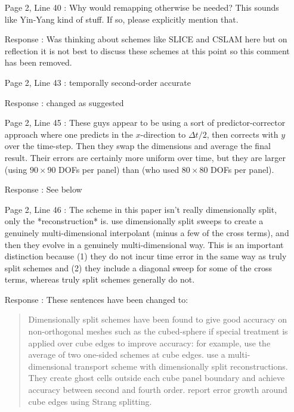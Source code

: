 \documentclass[12pt]{article}
\begin{document}
\begin{enumerate}
\item [Page 2, Line 40]: Why would remapping otherwise be needed? This sounds like Yin-Yang kind of stuff. If so, please explicitly mention that.

\item [Response]: Was thinking about schemes like SLICE and CSLAM here but on reflection it is not best to discuss these schemes at this point so this comment has been removed. 

\item [Page 2, Line 43]: temporally second-order accurate

\item [Response]: changed as suggested

\item [Page 2, Line 45]: These guys \cite[]{PL07} appear to be using a sort of predictor-corrector approach where one predicts in the $x$-direction to $\Delta t/2$, then corrects with $y$ over the time-step. Then they swap the dimensions and average the final result. Their errors are certainly more uniform over time, but they are larger (using $90\times 90$ DOFs per panel) than \cite{GNQ14} (who used $80\times 80$ DOFs per panel).

\item [Response]: See below

\item [Page 2, Line 46]: The scheme \cite[]{KNK15} in this paper isn't really dimensionally split, only the *reconstruction* is. \cite{KNK15} use dimensionally split sweeps to create a genuinely multi-dimensional interpolant (minus a few of the cross terms), and then they evolve in a genuinely multi-dimensional way. This is an important distinction because (1) they do not incur time error in the same way as truly split schemes and (2) they include a diagonal sweep for some of the cross terms, whereas truly split schemes generally do not.

\item [Response]: These sentences have been changed to:
\begin{quote}
Dimensionally split schemes have been found to give good accuracy on non-orthogonal meshes such as the cubed-sphere if special treatment is applied over cube edges to improve accuracy: for example, \cite{PL07} use the average of two one-sided schemes at cube edges. \cite{KNK15} use a multi-dimensional transport scheme with dimensionally split reconstructions. They create ghost cells outside each cube panel boundary and achieve accuracy between second and fourth order. \cite{GNQ14} report error growth around cube edges using Strang splitting. 
\end{quote}


\end{enumerate}
\end{document}

